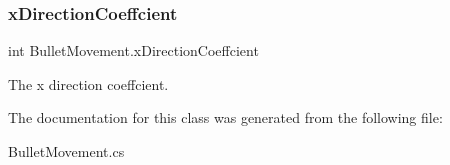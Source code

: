 \subsubsection{\texorpdfstring{x\+Direction\+Coeffcient}{xDirectionCoeffcient}}
{\footnotesize\ttfamily int Bullet\+Movement.\+x\+Direction\+Coeffcient}



The x direction coeffcient. 



The documentation for this class was generated from the following file\+:\begin{DoxyCompactItemize}
\item 
Bullet\+Movement.\+cs\end{DoxyCompactItemize}
